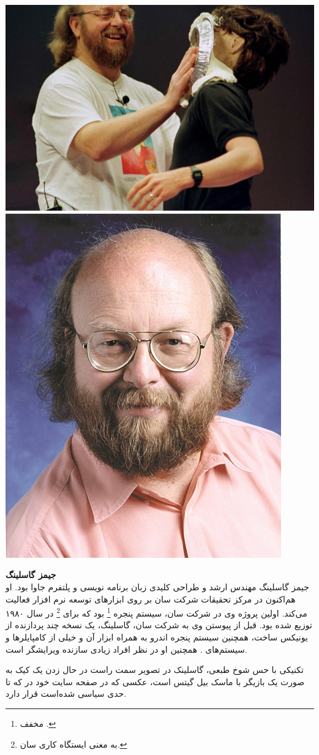 \documentclass[a4paper,12pt]{report}
\begin{document}
	\begin{center}
		\begin{tcolorbox}[breakable]
			\begin{center}
				\includegraphics[width=0.5\linewidth]{image/james_gosling_pie_cake_2.jpg}\quad
				\includegraphics[width=0.267\linewidth]{image/james_gosling.jpg}
			\end{center}\vspace{5mm}
			\noindent\textbf{
			جیمز گاسلینگ }
			\\[5mm]		
		جیمز گاسلینگ مهندس ارشد و طراحی کلیدی زبان برنامه نویسی و پلتفرم جاوا بود. او هم‌اکنون در مرکز 
		تحقیقات شرکت سان بر روی ابزار‌های توسعه نرم افزار فعالیت می‌کند. اولین پروژه وی در شرکت سان،  سیستم
		پنجره 
	\footnote{مخفف .}
		بود که برای 
		\footnote{
		به معنی ایستگاه کاری سان.} در سال ۱۹۸۰ توزیع شده بود.
		قبل از پیوستن وی به شرکت سان، گاسلینگ، یک نسخه چند پردازنده از یونیکس 
		 ساخت، همچنین سیستم پنجره اندرو
		به همراه ابزار آن 	 و خیلی از کامپایلر‌ها و سیستم‌های 
		.
		همچنین او در نظر افراد زیادی سازنده ویرایشگر
		  است.
		
		تکنیکی با حس شوخ طبعی، گاسلینک در تصویر سمت راست در حال زدن یک کیک به صورت یک بازیگر با ماسک بیل گیتس است، عکسی که در صفحه سایت خود در 
		 که تا حدی سیاسی شده‌است قرار دارد.
		

\end{tcolorbox}
\end{center}
\end{document}
